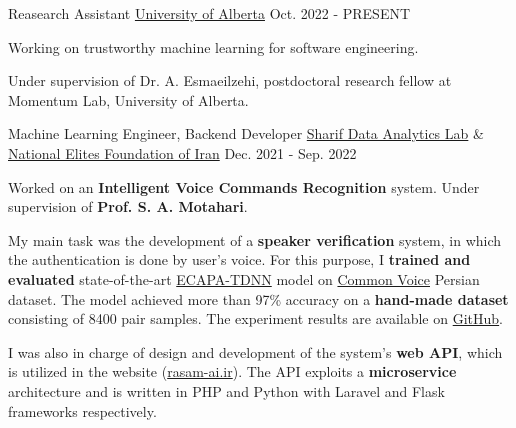 

\begin{cventries}

  \cventry
    {Reasearch Assistant} %
    {\href{https://www.ualberta.ca/index.html}{University of Alberta}} %
    {} %
    {Oct. 2022 - PRESENT} %
    {
      \begin{cvitems} %
        \item {Working on trustworthy machine learning for software engineering.}
        \item {Under supervision of Dr. A. Esmaeilzehi, postdoctoral research fellow at Momentum Lab, University of Alberta.}
      \end{cvitems}
    }

  \cventry
    {Machine Learning Engineer, Backend Developer} %
    {\href{https://www.sharif.edu/}{Sharif Data Analytics Lab} \& \href{https://en.bmn.ir/}{National Elites Foundation of Iran}} %
    {} %
    {Dec. 2021 - Sep. 2022} %
    {
      \begin{cvitems} %
        \item {Worked on an \textbf{Intelligent Voice Commands Recognition} system. Under supervision of \textbf{Prof. S. A. Motahari}.}
        \item {My main task was the development of a \textbf{speaker verification} system, in which the authentication is done by user's voice. For this purpose, I \textbf{trained and evaluated} state-of-the-art \href{https://arxiv.org/abs/2005.07143}{ECAPA-TDNN} model on \href{https://commonvoice.mozilla.org}{Common Voice} Persian dataset. The model achieved more than 97\% accuracy on a \textbf{hand-made dataset} consisting of 8400 pair samples. The experiment results are available on \href{https://github.com/radinshayanfar/speaker-verification}{GitHub}.}
        \item{I was also in charge of design and development of the system's \textbf{web API}, which is utilized in the website (\href{https://rasam-ai.ir/}{rasam-ai.ir}). The API exploits a \textbf{microservice} architecture and is written in PHP and Python with Laravel and Flask frameworks respectively.}
      \end{cvitems}
    }


\end{cventries}
